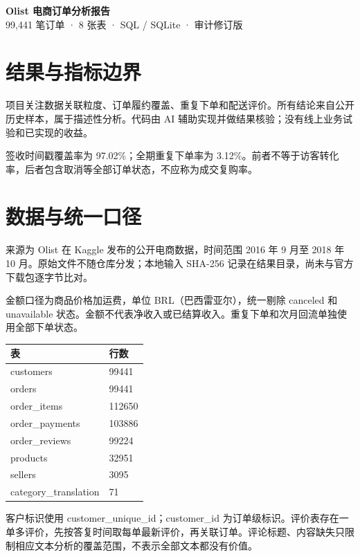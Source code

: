 \documentclass[11pt]{ctexart}
\begin{document}
\begin{center}{\LARGE\bfseries Olist 电商订单分析报告}\\[8pt]99,441 笔订单 · 8 张表 · SQL / SQLite · 审计修订版\end{center}
\section{结果与指标边界}
项目关注数据关联粒度、订单履约覆盖、重复下单和配送评价。所有结论来自公开历史样本，属于描述性分析。代码由 AI 辅助实现并做结果核验；没有线上业务试验和已实现的收益。

签收时间戳覆盖率为 97.02\%；全期重复下单率为 3.12\%。前者不等于访客转化率，后者包含取消等全部订单状态，不应称为成交复购率。

\section{数据与统一口径}
来源为 Olist 在 Kaggle 发布的公开电商数据，时间范围 2016 年 9 月至 2018 年 10 月。原始文件不随仓库分发；本地输入 SHA-256 记录在结果目录，尚未与官方下载包逐字节比对。

金额口径为商品价格加运费，单位 BRL（巴西雷亚尔），统一剔除 canceled 和 unavailable 状态。金额不代表净收入或已结算收入。重复下单和次月回流单独使用全部下单状态。
\begin{center}
\small
\begin{tabular}{ll}
\toprule
表 & 行数 \\
\midrule
customers & 99441 \\
orders & 99441 \\
order\_items & 112650 \\
order\_payments & 103886 \\
order\_reviews & 99224 \\
products & 32951 \\
sellers & 3095 \\
category\_translation & 71 \\
\bottomrule
\end{tabular}
\end{center}
客户标识使用 customer\_unique\_id；customer\_id 为订单级标识。评价表存在一单多评价，先按答复时间取每单最新评价，再关联订单。评论标题、内容缺失只限制相应文本分析的覆盖范围，不表示全部文本都没有价值。
\newpage
\end{document}
